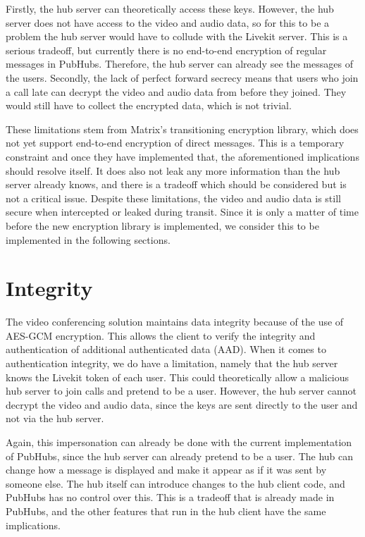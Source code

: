 \documentclass{report}
\begin{document}
Firstly, the hub server can theoretically access these
keys. However, the hub server does not have access to the video and audio data, so for this to be a problem the hub
server would have to collude with the Livekit server. This is a serious tradeoff, but currently there is no end-to-end
encryption of regular messages in PubHubs. Therefore, the hub server can already see the messages of the users. Secondly,
the lack of perfect forward secrecy means that users who join a call late can decrypt the video and audio data from
before they joined. They would still have to collect the encrypted data, which is not trivial.

These limitations stem from Matrix's transitioning encryption library, which does not yet support end-to-end
encryption of direct messages. This is a temporary constraint and once they have implemented that, the
aforementioned implications should resolve itself. It does also not leak any more information than the hub server
already knows, and there is a tradeoff which should be considered but is not a critical issue. Despite these limitations,
the video and audio data is still secure when intercepted or leaked during transit. Since it is only a matter of time
before the new encryption library is implemented, we consider this to be implemented in the following sections.

\section{Integrity}
The video conferencing solution maintains data integrity because of the use of AES-GCM encryption. This allows the
client to verify the integrity and authentication of additional authenticated data (AAD). When it comes to
authentication integrity, we do have a limitation, namely that the hub server knows the Livekit token of each user.
This could theoretically allow a malicious hub server to join calls and pretend to be a user. However, the hub
server cannot decrypt the video and audio data, since the keys are sent directly to the user and not via the hub server.

Again, this impersonation can already be done with the current implementation of PubHubs, since the hub server can
already pretend to be a user. The hub can change how a message is displayed and make it appear as if it was sent by
someone else. The hub itself can introduce changes to the hub client code, and PubHubs has no control over this.
This is a tradeoff that is already made in PubHubs, and the other features that run in the hub client have the same
implications.
\end{document}
